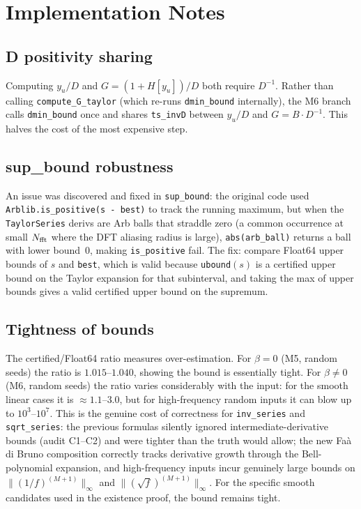 \documentclass[11pt]{article}
\theoremstyle{definition}
\begin{document}
\section{Implementation Notes}

\subsection{D positivity sharing}
Computing $y_u/D$ and $G=(1+H[y_u])/D$ both require $D^{-1}$.
Rather than calling \texttt{compute\_G\_taylor} (which re-runs \texttt{dmin\_bound}
internally), the M6 branch calls \texttt{dmin\_bound} once and shares
\texttt{ts\_invD} between $y_u/D$ and $G = B \cdot D^{-1}$.  This halves the
cost of the most expensive step.

\subsection{sup\_bound robustness}
An issue was discovered and fixed in \texttt{sup\_bound}:
the original code used \texttt{Arblib.is\_positive(s - best)} to track the
running maximum, but when the \texttt{TaylorSeries} derivs are Arb balls that
straddle zero (a common occurrence at small $N_{\rm fft}$ where the DFT aliasing
radius is large), \texttt{abs(arb\_ball)} returns a ball with lower bound~0,
making \texttt{is\_positive} fail.
The fix: compare Float64 upper bounds of $s$ and \texttt{best}, which is valid
because \texttt{ubound}$(s)$ is a certified upper bound on the Taylor expansion
for that subinterval, and taking the max of upper bounds gives a valid certified
upper bound on the supremum.

\subsection{Tightness of bounds}
The certified/Float64 ratio measures over-estimation.  For $\beta=0$
(M5, random seeds) the ratio is $1.015$--$1.040$, showing the bound is
essentially tight.  For $\beta\neq 0$ (M6, random seeds) the ratio varies
considerably with the input: for the smooth linear cases it is
$\approx 1.1$--$3.0$, but for high-frequency random inputs it can blow up to
$10^3$--$10^7$.  This is the genuine cost of correctness for
\texttt{inv\_series} and \texttt{sqrt\_series}: the previous formulas
silently ignored intermediate-derivative bounds (audit C1--C2) and were
tighter than the truth would allow; the new Fa\`a di Bruno
composition correctly tracks derivative growth through the Bell-polynomial
expansion, and high-frequency inputs incur genuinely large bounds on
$\|(1/f)^{(M+1)}\|_\infty$ and $\|(\sqrt f)^{(M+1)}\|_\infty$.  For the
specific smooth candidates used in the existence proof, the bound remains
tight.
\end{document}
